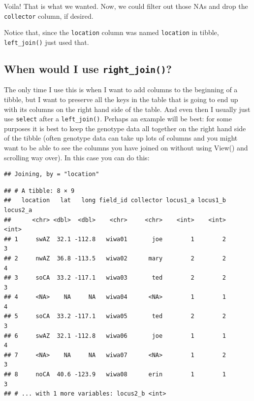 \documentclass[]{book}
\newenvironment{Shaded}{\begin{snugshade}}{\end{snugshade}}
\newcommand{\KeywordTok}[1]{\textcolor[rgb]{0.13,0.29,0.53}{\textbf{{#1}}}}
\newcommand{\DataTypeTok}[1]{\textcolor[rgb]{0.13,0.29,0.53}{{#1}}}
\newcommand{\StringTok}[1]{\textcolor[rgb]{0.31,0.60,0.02}{{#1}}}
\newcommand{\NormalTok}[1]{{#1}}
\theoremstyle{definition}
\theoremstyle{definition}
\theoremstyle{remark}
\begin{document}
Voila! That is what we wanted. Now, we could filter out those NAs and
drop the \texttt{collector} column, if desired.

Notice that, since the \texttt{location} column was named
\texttt{location} in tibble, \texttt{left\_join()} just used that.

\subsection{\texorpdfstring{When would I use
\texttt{right\_join()}?}{When would I use right\_join()?}}\label{when-would-i-use-right_join}

The only time I use this is when I want to add columns to the beginning
of a tibble, but I want to preserve all the keys in the table that is
going to end up with its columns on the right hand side of the table.
And even then I usually just use \texttt{select} after a
\texttt{left\_join()}. Perhaps an example will be best: for some
purposes it is best to keep the genotype data all together on the right
hand side of the tibble (often genotype data can take up lots of columns
and you might want to be able to see the columns you have joined on
without using View() and scrolling way over). In this case you can do
this:

\begin{Shaded}
\end{Shaded}

\begin{verbatim}
## Joining, by = "location"
\end{verbatim}

\begin{verbatim}
## # A tibble: 8 × 9
##   location   lat   long field_id collector locus1_a locus1_b locus2_a
##      <chr> <dbl>  <dbl>    <chr>     <chr>    <int>    <int>    <int>
## 1     swAZ  32.1 -112.8   wiwa01       joe        1        2        3
## 2     nwAZ  36.8 -113.5   wiwa02      mary        2        2        4
## 3     soCA  33.2 -117.1   wiwa03       ted        2        2        3
## 4     <NA>    NA     NA   wiwa04      <NA>        1        1        4
## 5     soCA  33.2 -117.1   wiwa05       ted        2        2        3
## 6     swAZ  32.1 -112.8   wiwa06       joe        1        1        4
## 7     <NA>    NA     NA   wiwa07      <NA>        1        2        3
## 8     noCA  40.6 -123.9   wiwa08      erin        1        1        3
## # ... with 1 more variables: locus2_b <int>
\end{verbatim}
\end{document}

